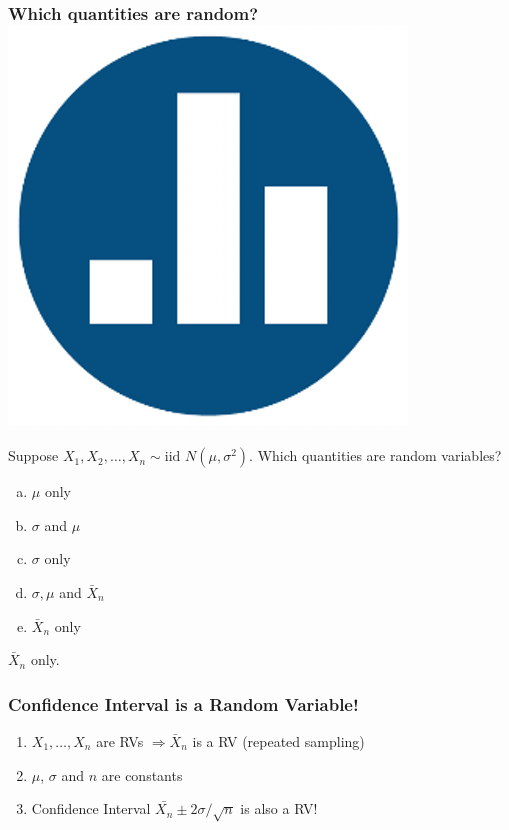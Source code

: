 \documentclass[handout]{beamer}
\begin{document}
\begin{frame}
\frametitle{Which quantities are random?\hfill \includegraphics[scale = 0.05]{./images/clicker}}
Suppose $X_1, X_2, \hdots, X_n\sim \mbox{iid } N(\mu,\sigma^2)$.
Which quantities are random variables?
	\begin{enumerate}[(a)]
\item $\mu$ only
\item $\sigma$ and $\mu$
\item $\sigma$ only
\item $\sigma, \mu$ and $\bar{X}_n$
\item $\bar{X}_n$ only
\end{enumerate}

\vspace{1em}
\pause
\alert{\large $\bar{X}_n$ only.}

\end{frame}
\begin{frame}
\frametitle{Confidence Interval is a Random Variable!}
\begin{enumerate}
	\item $X_1, \hdots, X_n$ are RVs $\Rightarrow \bar{X}_n$ is a RV (repeated sampling) \pause
	\item $\mu$, $\sigma$ and $n$ are constants \pause
	\item Confidence Interval $\bar{X_n}\pm 2 \sigma/\sqrt{n}$ is also a RV!
\end{enumerate}


\end{frame}
\end{document}
